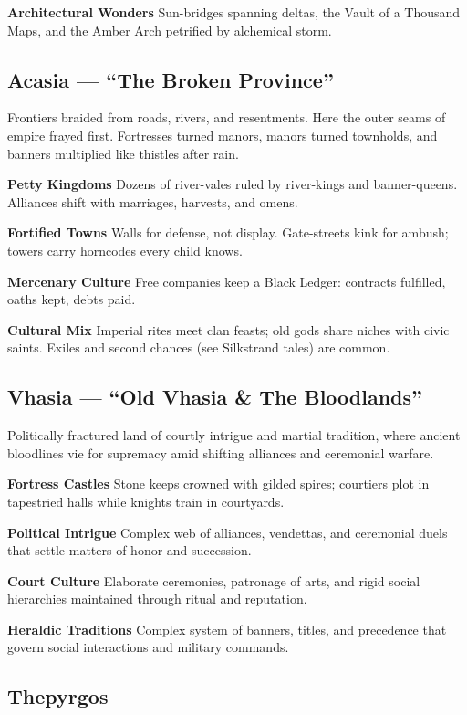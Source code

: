 \documentclass[11pt,twoside,openany]{book}
\begin{document}
\textbf{Architectural Wonders} Sun-bridges spanning deltas, the Vault of a Thousand Maps, and the Amber Arch petrified by alchemical storm.

\subsection*{Acasia --- ``The Broken Province''}

Frontiers braided from roads, rivers, and resentments. Here the outer seams of empire frayed first. Fortresses turned manors, manors turned townholds, and banners multiplied like thistles after rain.

\textbf{Petty Kingdoms} Dozens of river-vales ruled by river-kings and banner-queens. Alliances shift with marriages, harvests, and omens.

\textbf{Fortified Towns} Walls for defense, not display. Gate-streets kink for ambush; towers carry horncodes every child knows.

\textbf{Mercenary Culture} Free companies keep a Black Ledger: contracts fulfilled, oaths kept, debts paid.

\textbf{Cultural Mix} Imperial rites meet clan feasts; old gods share niches with civic saints. Exiles and second chances (see Silkstrand tales) are common.

\subsection*{Vhasia --- ``Old Vhasia \& The Bloodlands''}

Politically fractured land of courtly intrigue and martial tradition, where ancient bloodlines vie for supremacy amid shifting alliances and ceremonial warfare.

\textbf{Fortress Castles} Stone keeps crowned with gilded spires; courtiers plot in tapestried halls while knights train in courtyards.

\textbf{Political Intrigue} Complex web of alliances, vendettas, and ceremonial duels that settle matters of honor and succession.

\textbf{Court Culture} Elaborate ceremonies, patronage of arts, and rigid social hierarchies maintained through ritual and reputation.

\textbf{Heraldic Traditions} Complex system of banners, titles, and precedence that govern social interactions and military commands.

\subsection*{Thepyrgos}
\end{document}
